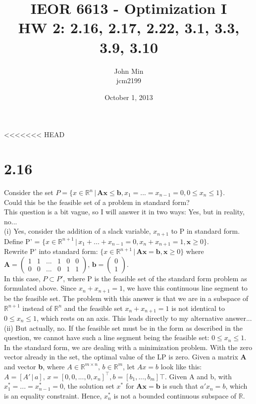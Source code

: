 \documentclass{article}
\begin{document}
\title{IEOR 6613 - Optimization I\\ HW 2:  2.16, 2.17, 2.22, 3.1, 3.3, 3.9, 3.10}

\author{John Min\\ jcm2199}
<<<<<<< HEAD
\date{October 1, 2013}
\maketitle
\pagebreak


\section*{2.16}
Consider the set $P = \{x \in \mathbb{R}^n \, |\, \mathbf{Ax \leq b}, x_1 = ... = x_{n-1} = 0, 0 \leq x_n \leq 1 \}$.  \\
Could this be the feasible set of a problem in standard form? \\

\noindent
This question is a bit vague, so I will answer it in two ways:  Yes, but in reality, no...  \\

\noindent
(i) Yes, consider the addition of a slack variable, $x_{n+1}$ to P in standard form. \\  Define P' = $\{x \in \mathbb{R}^{n+1} \, | \, x_1 + ... + x_{n-1} = 0, x_n + x_{n+1} = 1, \mathbf{x} \geq 0 \}$.  \\
Rewrite P' into standard form: $\{x \in \mathbb{R}^{n+1} \, | \, \mathbf{Ax = b}, \mathbf{x} \geq 0 \}$ where $\mathbf{A} = \begin{pmatrix}
	1 & 1 & ... & 1 & 0 & 0 \\
	0 & 0 & ... & 0 & 1 & 1 
	\end{pmatrix}
$, $\mathbf{b} = \begin{pmatrix}
	0\\
	1
	\end{pmatrix}
$.\\
In this case, $P \subset P'$, where P is the feasible set of the standard form problem as formulated above.  Since $x_n + x_{n+1} = 1$, we have this continuous line segment to be the feasible set.  The problem with this answer is that we are in a subspace of $\mathbb{R}^{n+1}$ instead of $\mathbb{R}^n$ and the feasible set $x_n + x_{n+1} = 1$ is not identical to $0 \leq x_n \leq 1$, which rests on an axis.
This leads directly to my alternative answer...\\

\noindent 
(ii) But actually, no.  If the feasible set must be in the form as described in the question, we cannot have such a line segment being the feasible set: $0 \leq x_n \leq 1$.  In the standard form, we are dealing with a minimization problem.  With the zero vector already in the set, the optimal value of the LP is zero.  Given a matrix \textbf{A} and vector \textbf{b}, where $A \in \mathbb{R}^{m \times n}, \, b \in \mathbb{R}^m$, let $Ax = b$ look like this:  $A = [A' \, | \, a], \, x = [0, 0, ..., 0, x_n]^\top, b = [b_1, ..., b_m]\top$.  Given A and b, with $x^*_1 = ... = x^*_{n-1} = 0$, the solution set $x^*$ for $\mathbf{Ax = b}$ is such that $a' x_n = b$, which is an equality constraint.  Hence, $x^*_n$ is not a bounded continuous subspace of $\mathbb{R}$.
\end{document}
